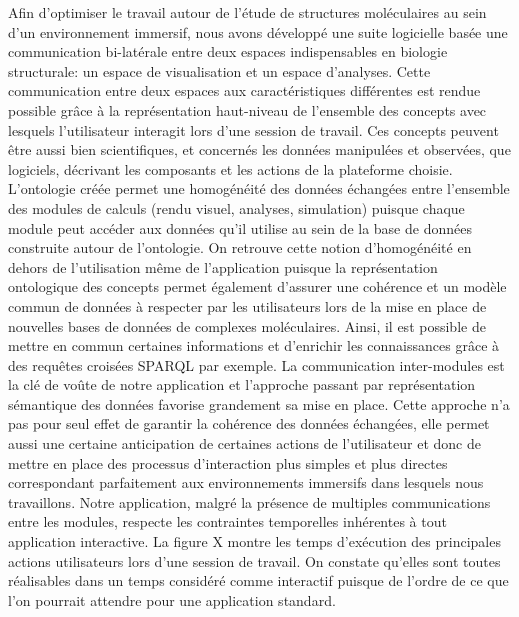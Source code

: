 Afin d'optimiser le travail autour de l'étude de structures moléculaires au sein d'un environnement immersif, nous avons développé une suite logicielle basée une communication bi-latérale entre deux espaces indispensables en biologie structurale: un espace de visualisation et un espace d'analyses. Cette communication entre deux espaces aux caractéristiques différentes est rendue possible grâce à la représentation haut-niveau de l'ensemble des concepts avec lesquels l'utilisateur interagit lors d'une session de travail. Ces concepts peuvent être aussi bien scientifiques, et concernés les données manipulées et observées, que logiciels, décrivant les composants et les actions de la plateforme choisie. L'ontologie créée permet une homogénéité des données échangées entre l'ensemble des modules de calculs (rendu visuel, analyses, simulation) puisque chaque module peut accéder aux données qu'il utilise au sein de la base de données construite autour de l'ontologie. On retrouve cette notion d'homogénéité en dehors de l'utilisation même de l'application puisque la représentation ontologique des concepts permet également d'assurer une cohérence et un modèle commun de données à respecter par les utilisateurs lors de la mise en place de nouvelles bases de données de complexes moléculaires. Ainsi, il est possible de mettre en commun certaines informations et d'enrichir les connaissances grâce à des requêtes croisées SPARQL par exemple. La communication inter-modules est la clé de voûte de notre application et l'approche passant par représentation sémantique des données favorise grandement sa mise en place. Cette approche n'a pas pour seul effet de garantir la cohérence des données échangées, elle permet aussi une certaine anticipation de certaines actions de l'utilisateur et donc de mettre en place des processus d'interaction plus simples et plus directes correspondant parfaitement aux environnements immersifs dans lesquels nous travaillons.
Notre application, malgré la présence de multiples communications entre les modules, respecte les contraintes temporelles inhérentes à tout application interactive. La figure X montre les temps d'exécution des principales actions utilisateurs lors d'une session de travail. On constate qu'elles sont toutes réalisables dans un temps considéré comme interactif puisque de l'ordre de ce que l'on pourrait attendre pour une application standard.
